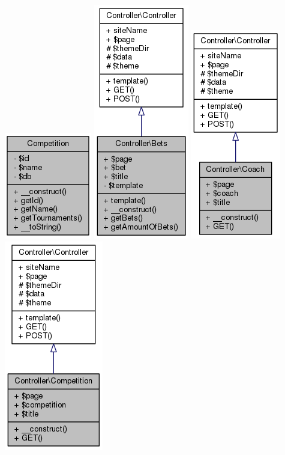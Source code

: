\documentclass[11pt]{article}
\begin{document}
\includegraphics[scale=0.4]{UML_Competition.png}
\includegraphics[scale=0.4]{UML_Controller_1_1Bets.png}
\includegraphics[scale=0.4]{UML_Controller_1_1Coach.png}
\includegraphics[scale=0.4]{UML_Controller_1_1Competition.png}
\end{document}
